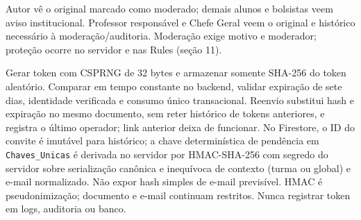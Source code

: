 \begin{regra}[DP-C02: moderação]
Autor vê o original marcado como moderado; demais alunos e bolsistas veem aviso institucional. Professor responsável e Chefe Geral veem o original e histórico necessário à moderação/auditoria. Moderação exige motivo e moderador; proteção ocorre no servidor e nas Rules (seção 11).
\end{regra}
\begin{regra}
Gerar token com CSPRNG de 32 bytes e armazenar somente SHA-256 do token aleatório. Comparar em tempo constante no backend, validar expiração de sete dias, identidade verificada e consumo único transacional. Reenvio substitui hash e expiração no mesmo documento, sem reter histórico de tokens anteriores, e registra o último operador; link anterior deixa de funcionar. No Firestore, o ID do convite é imutável para histórico; a chave determinística de pendência em \texttt{Chaves\_Unicas} é derivada no servidor por HMAC-SHA-256 com segredo do servidor sobre serialização canônica e inequívoca de contexto (turma ou global) e e-mail normalizado. Não expor hash simples de e-mail previsível. HMAC é pseudonimização; documento e e-mail continuam restritos. Nunca registrar token em logs, auditoria ou banco.
\end{regra}

